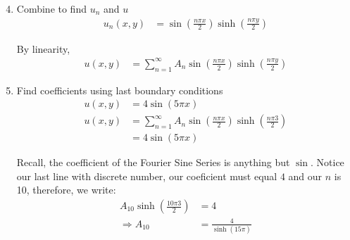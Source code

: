 \begin{enumerate}
  \setcounter{enumi}{3}
  \item Combine to find $u_n$ and $u$
  \begin{align}
    u_n(x, y)
    & = \sin\left( \frac{n \pi x}{2} \right)\sinh\left(\frac{n\pi y}{2} \right)
  \end{align}

  By linearity,
  \begin{align}
    u(x, y)
    & = \sum^\infty_{n = 1}
    A_n \sin\left( \frac{n \pi x}{2} \right)
    \sinh\left( \frac{n \pi y}{2} \right)
  \end{align}

  \item Find coefficients using last boundary conditions
  \begin{align}
    u(x, y)
    & = 4 \sin(5 \pi x)\\
    u(x, y)
    & = \sum^\infty_{n = 1}
    A_n \sin\left(\frac{n \pi x}{2} \right)
    \sinh\left(\frac{n \pi 3}{2} \right)\\
    & = 4\sin(5 \pi x)
  \end{align}

  Recall, the coefficient of the Fourier Sine Series is anything but $\sin$.
  Notice our last line with discrete number,
  our coeficient must equal $4$ and our $n$ is 10, therefore, we write:
  \begin{align}
    A_{10} \sinh\left( \frac{10 \pi 3}{2} \right) & = 4\\
    \Rightarrow A_{10} & = \frac{4}{\sinh(15 \pi)} %
  \end{align}
\end{enumerate}
